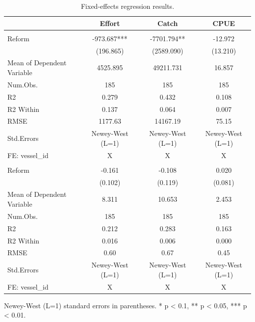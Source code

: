 \begin{table}

\caption{\label{tab:main}Fixed-effects regression results.}
\centering
\begin{threeparttable}
\begin{tabular}[t]{lccc}
\toprule
  & Effort & Catch & CPUE\\
\midrule
\addlinespace[0.3em]
\multicolumn{4}{l}{Levels}\\
\hspace{1em}Reform & -973.687*** & -7701.794** & -12.972\\
\hspace{1em} & (196.865) & (2589.090) & (13.210)\\
\hspace{1em}Mean of Dependent Variable & 4525.895 & 49211.731 & 16.857\\
\hspace{1em}Num.Obs. & 185 & 185 & \vphantom{1} 185\\
\hspace{1em}R2 & 0.279 & 0.432 & 0.108\\
\hspace{1em}R2 Within & 0.137 & 0.064 & 0.007\\
\hspace{1em}RMSE & 1177.63 & 14167.19 & 75.15\\
\hspace{1em}Std.Errors & Newey-West (L=1) & Newey-West (L=1) & Newey-West \vphantom{1} (L=1)\\
\hspace{1em}FE: vessel\_id & X & X & \vphantom{1} X\\
\addlinespace[0.5cm]
\multicolumn{4}{l}{Log}\\
\hspace{1em}Reform & -0.161 & -0.108 & 0.020\\
\hspace{1em} & (0.102) & (0.119) & (0.081)\\
\hspace{1em}Mean of Dependent Variable & 8.311 & 10.653 & 2.453\\
\hspace{1em}Num.Obs. & 185 & 185 & 185\\
\hspace{1em}R2 & 0.212 & 0.283 & 0.163\\
\hspace{1em}R2 Within & 0.016 & 0.006 & 0.000\\
\hspace{1em}RMSE & 0.60 & 0.67 & 0.45\\
\hspace{1em}Std.Errors & Newey-West (L=1) & Newey-West (L=1) & Newey-West (L=1)\\
\hspace{1em}FE: vessel\_id & X & X & X\\
\bottomrule
\end{tabular}
\begin{tablenotes}
\item Newey-West (L=1) standard errors in parentheses. * p < 0.1, ** p < 0.05, *** p < 0.01.
\end{tablenotes}
\end{threeparttable}
\end{table}

